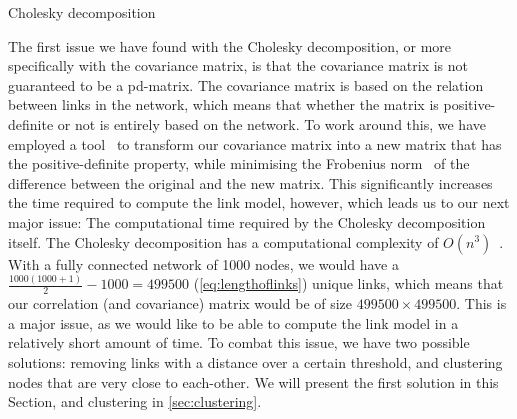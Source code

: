 \begin{algorithm}[H]
    \DontPrintSemicolon
    \caption{Cholesky decomposition}
    \label{algo:cholesky}
\end{algorithm}
\medbreak
The first issue we have found with the Cholesky decomposition, or more specifically with the covariance matrix, is that the covariance matrix is not guaranteed to be a \gls{pd-matrix}. The covariance matrix is based on the relation between links in the network, which means that whether the matrix is positive-definite or not is entirely based on the network. To work around this, we have employed a tool~\cite{website:nearestspd} to transform our covariance matrix into a new matrix that has the positive-definite property, while minimising the Frobenius norm~\cite{website:frobieniusnorm} of the difference between the original and the new matrix. This significantly increases the time required to compute the link model, however, which leads us to our next major issue: The computational time required by the Cholesky decomposition itself. \smallbreak
The Cholesky decomposition has a computational complexity of $O(n^3)$~\citationneeded. With a fully connected network of 1000 nodes, we would have a $\frac{1000(1000+1)}{2} - 1000 = 499500$ (\autoref{eq:lengthoflinks}) unique links, which means that our correlation (and covariance) matrix would be of size $499500 \times 499500$. This is a major issue, as we would like to be able to compute the link model in a relatively short amount of time. To combat this issue, we have two possible solutions: removing links with a distance over a certain threshold, and clustering nodes that are very close to each-other. We will present the first solution in this Section, and clustering in \autoref{sec:clustering}.\medbreak

